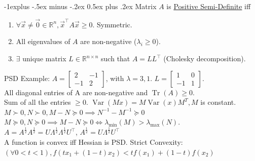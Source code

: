 \documentclass[10pt,landscape]{article}
\makeatletter
\DeclareMathOperator*{\Var}{Var}
\DeclareMathOperator*{\trace}{Tr}
\renewcommand{\subsection}{\@startsection{subsection}{2}{0mm}%
                                {-1explus -.5ex minus -.2ex}%
                                {0.5ex plus .2ex}%
                                {\normalfont\normalsize\bfseries}}
\makeatother
\begin{document}
\begin{multicols}{3}
\subsection{Matrix $A$ is \underline{Positive Semi-Definite} iff}
\begin{enumerate}[label=(\alph*)]
    \item $\forall \vec x \neq \vec{0} \in \mathbb{R}^{n}, \vec x^{\top} A \vec x \geq 0$. Symmetric.
    \item All eigenvalues of $A$ are non-negative ($\lambda_i\ge0$).
    \item $\exists$ unique matrix $L \in \mathbb{R}^{n \times n}$ such that $A=L L^{\top}$ (Cholesky decomposition).
\end{enumerate}
PSD Example: $A=\begin{bmatrix}2&-1\\-1&2\end{bmatrix}$, with $\lambda=3,1$. $L=\begin{bmatrix}1&0\\-1&1\end{bmatrix}$.
\\
All diagonal entries of A are non-negative and $\trace(A)\geq0$. \\
Sum of all the entries $\geq0$. $\Var(Mx) = M\Var(x)M^T, M$ is constant.
$M\succ0, N\succ0, M-N\succeq0\implies N^{-1}-M^{-1}\succeq0$\\
$M\succeq0, N\succeq0\implies M-N\succeq0\iff\lambda_{\min}(M)>\lambda_{\max}(N)$.\\
$A = A^{\frac{1}{2}}A^{\frac{1}{2}}=U \Lambda^{\frac{1}{2}}\Lambda^{\frac{1}{2}}U^{\top}$, $A^{\frac{1}{2}} = U \Lambda^{\frac{1}{2}}U^{\top}$  \\
A function is convex iff Hessian is PSD. Strict Convexity: $(\forall 0<t<1), f(tx_1+(1-t)x_2)<tf(x_1)+(1-t)f(x_2)$


\end{multicols}
\end{document}
